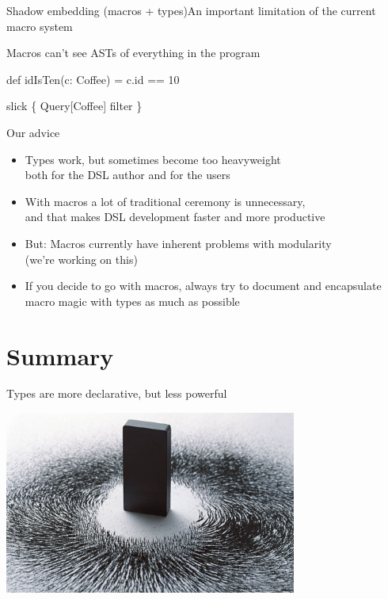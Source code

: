 \documentclass{beamer}
\begin{document}
\begin{frame}[fragile]{Shadow embedding (macros + types)}{An important limitation of the current macro system}
  \vspace{1em}
  \begin{alertblock}{Macros can't see ASTs of everything in the program}
    \begin{semiverbatim}
def idIsTen(c: Coffee) = c.id == 10

slick \{
  Query[Coffee] filter \text{\color{blue}{idIsTen}}
\}
    \end{semiverbatim}
  \end{alertblock}
\end{frame}

\begin{frame}{Our advice}
  \begin{itemize}
    \item Types work, but sometimes become too heavyweight\\
          both for the DSL author and for the users
    \item With macros a lot of traditional ceremony is unnecessary,\\
          and that makes DSL development faster and more productive
    \item But: Macros currently have inherent problems with modularity\\
          (we're working on this)
    \item If you decide to go with macros, always try to document and encapsulate
          macro magic with types as much as possible
  \end{itemize}
\end{frame}

  \section{Summary}

\begin{frame}[fragile]{Types are more declarative, but less powerful}
  \begin{center}
    \includegraphics[height=6cm]{img/magnet.jpg}
  \end{center}
\end{frame}
\end{document}
